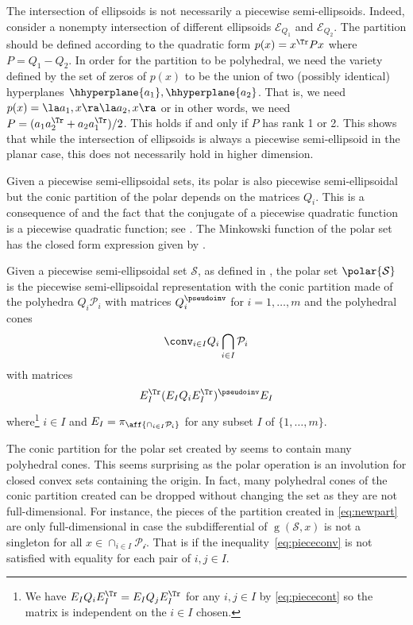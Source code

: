 \documentclass[11pt,twoside,a4paper,openright]{uclouvain-thesis}
\DeclareMathOperator{\gauge}{g}
\begin{document}
\begin{myrem}
  The intersection of ellipsoids is not necessarily a piecewise semi-ellipsoids.
  Indeed, consider a nonempty intersection of different ellipsoids $\mathcal{E}_{Q_1}$ and $\mathcal{E}_{Q_2}$.
  The partition should be defined according to the quadratic form $p(x) = x^\Tr P x$
  where $P = Q_1 - Q_2$.
  In order for the partition to be polyhedral, we need the variety defined by
  the set of zeros of $p(x)$ to be the union of two (possibly identical) hyperplanes
  $\hhyperplane{a_1}, \hhyperplane{a_2}$.
  That is, we need $p(x) = \la a_1, x \ra \la a_2, x \ra$ or in other words,
  we need $P = (a_1 a_2^\Tr + a_2 a_1^\Tr) / 2$.
  This holds if and only if $P$ has rank 1 or 2.
  This shows that while the intersection of ellipsoids is always a piecewise semi-ellipsoid
  in the planar case, this does not necessarily hold in higher dimension.
\end{myrem}

Given a piecewise semi-ellipsoidal sets, its polar is also piecewise semi-ellipsoidal
but the conic partition of the polar depends on the matrices $Q_i$.
This is a consequence of  and the fact that
the conjugate of a piecewise quadratic function is a piecewise quadratic function; see \cite[Theorem~11.14]{rockafellarvariational}.
The Minkowski function of the polar set has the closed form expression given by .

\begin{myprop}
  \label{prop:polarpiece}
  Given a piecewise semi-ellipsoidal set $\mathcal{S}$,
  as defined in , the polar set $\polar{\mathcal{S}}$
  is the piecewise semi-ellipsoidal representation with
  the conic partition made of the polyhedra $Q_i\mathcal{P}_i$
  with matrices $Q_i^\pseudoinv$ for $i = 1, \ldots, m$
  and the polyhedral cones
  \begin{equation}
    \label{eq:newpart}
    \conv_{i \in I} Q_i \bigcap_{i \in I} \mathcal{P}_i
  \end{equation}
  with matrices
  \[
    E_I^\Tr (E_I Q_i E_I^\Tr)^\pseudoinv E_I
  \]
  where\footnote{We have $E_I Q_i E_I^\Tr = E_I Q_j E_I^\Tr$ for any $i, j \in I$ by \eqref{eq:piececont} so the matrix is independent on the $i \in I$ chosen.} $i \in I$ and $E_I = \pi_{\aff{\cap_{i \in I} \mathcal{P}_i}}$
  for any subset $I$ of $\{1, \ldots, m\}$.
\end{myprop}

\begin{myrem}
  The conic partition for the polar set created by 
  seems to contain many polyhedral cones.
  This seems surprising as the polar operation is an involution for closed convex sets containing the origin.
  In fact, many polyhedral cones of the conic partition created can be dropped without
  changing the set as they are not full-dimensional.
  For instance, the pieces of the partition created in \eqref{eq:newpart}
  are only full-dimensional in case the subdifferential of $\gauge(\mathcal{S}, x)$ is not a singleton for all $x \in \cap_{i \in I} \mathcal{P_i}$.
  That is if the inequality~\eqref{eq:piececonv} is not satisfied with equality for each pair of $i, j \in I$.
\end{myrem}
\end{document}
